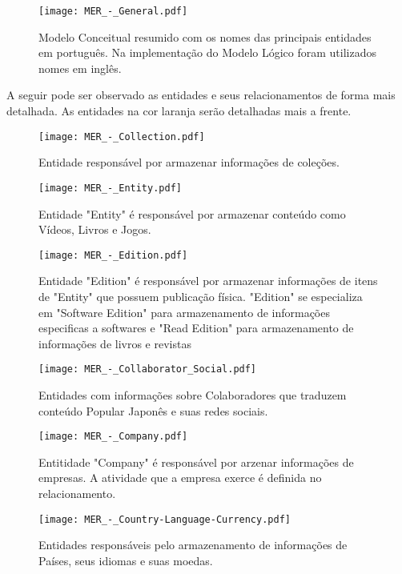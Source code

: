 \documentclass[12pt]{article}
\begin{document}
\begin{figure}[H]
\centering
\texttt{[image: MER\_-\_General.pdf]}
\caption{Modelo Conceitual resumido com os nomes das principais entidades em português. Na implementação do Modelo Lógico foram utilizados nomes em inglês.} \label{hash}
\end{figure}


A seguir pode ser observado as entidades e seus relacionamentos de forma mais detalhada. As entidades na cor laranja serão detalhadas mais a frente.

\begin{figure}[H]
\centering
\texttt{[image: MER\_-\_Collection.pdf]}
\caption{Entidade responsável por armazenar informações de coleções.} \label{collection}
\end{figure}


\begin{figure}[H]
\centering
\texttt{[image: MER\_-\_Entity.pdf]}
\caption{Entidade "Entity" é responsável por armazenar conteúdo como Vídeos, Livros e Jogos.} \label{entity}
\end{figure}

\begin{figure}[H]
\centering
\texttt{[image: MER\_-\_Edition.pdf]}
\caption{Entidade "Edition" é responsável por armazenar informações de itens de "Entity" que possuem publicação física. "Edition" se especializa em "Software Edition" para armazenamento de informações especificas a softwares e "Read Edition" para armazenamento de informações de livros e revistas} \label{edition}
\end{figure}

\begin{figure}[H]
\centering
\texttt{[image: MER\_-\_Collaborator\_Social.pdf]}
\caption{Entidades com informações sobre Colaboradores que traduzem conteúdo Popular Japonês e suas redes sociais.} \label{collaborator}
\end{figure}

\begin{figure}[H]
\centering
\texttt{[image: MER\_-\_Company.pdf]}
\caption{Entitidade "Company" é responsável por arzenar informações de empresas. A atividade que a empresa exerce é definida no relacionamento.} \label{company}
\end{figure}

\begin{figure}[H]
\centering
\texttt{[image: MER\_-\_Country-Language-Currency.pdf]}
\caption{Entidades responsáveis pelo armazenamento de informações de Países, seus idiomas e suas moedas.} \label{hash}
\end{figure}
\end{document}
